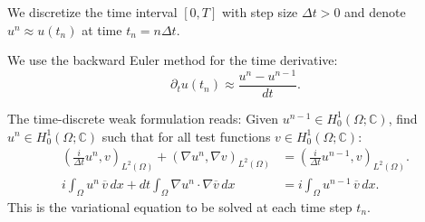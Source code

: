 \documentclass{article}
\theoremstyle{definition}
\theoremstyle{plain}
\theoremstyle{remark}
\begin{document}
We discretize the time interval $[0,T]$ with step size $\Delta t > 0$ and denote $u^n \approx u(t_n)$ at time $t_n = n\Delta t$.

We use the backward Euler method for the time derivative:
\[
\partial_t u(t_n) \approx \frac{u^n - u^{n-1}}{dt}.
\]

The time-discrete weak formulation reads:
Given $u^{n-1} \in H_0^1(\Omega; \mathbb{C})$, find $u^n \in H_0^1(\Omega; \mathbb{C})$ such that for all test functions $v \in H_0^1(\Omega; \mathbb{C})$:
\begin{align*}
\left( \frac{i}{\Delta t} u^n, v \right)_{L^2(\Omega)} + (\nabla u^n, \nabla v)_{L^2(\Omega)} &= \left( \frac{i}{\Delta t} u^{n-1}, v \right)_{L^2(\Omega)}.\\
i \int_{\Omega}  u^n \, \overline{v} \, dx 
+ dt \int_{\Omega} \nabla u^n \cdot \nabla \overline{v} \, dx 
&= i \int_{\Omega}  u^{n-1} \, \overline{v} \, dx.
\end{align*}
This is the variational equation to be solved at each time step $t_n$.
\end{document}
